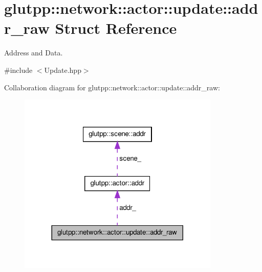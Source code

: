 \hypertarget{structglutpp_1_1network_1_1actor_1_1update_1_1addr__raw}{\section{glutpp\-:\-:network\-:\-:actor\-:\-:update\-:\-:addr\-\_\-raw \-Struct \-Reference}
\label{structglutpp_1_1network_1_1actor_1_1update_1_1addr__raw}
}


\-Address and \-Data.  




{\ttfamily \#include $<$\-Update.\-hpp$>$}



\-Collaboration diagram for glutpp\-:\-:network\-:\-:actor\-:\-:update\-:\-:addr\-\_\-raw\-:
\nopagebreak
\begin{figure}[H]
\begin{center}
\leavevmode
\includegraphics[width=272pt]{structglutpp_1_1network_1_1actor_1_1update_1_1addr__raw__coll__graph}
\end{center}
\end{figure}
